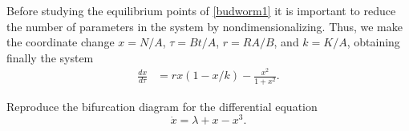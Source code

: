 Before studying the equilibrium points of \eqref{budworm1} it is important to reduce the number of parameters in the system by nondimensionalizing. Thus, we make the coordinate change $x = N/A$, $\tau = Bt/A$, $r = RA/B$, and $k = K/A$, obtaining finally the system 
\begin{align}
	\frac{dx}{d \tau} &= rx(1-x/k) - \frac{x^2}{1+x^2}.
\end{align}




\begin{problem}[Hysteresis]
Reproduce the bifurcation diagram for the differential equation
	\[\dot{x} = \lambda + x - x^3.\]
\end{problem}






